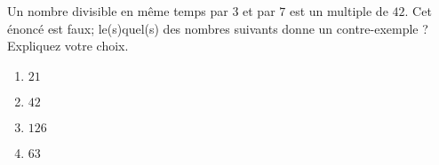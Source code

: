 
\begin{exercice}[\ldots /3]\label{exosmath-0831}

Un nombre divisible en même temps par \( 3\) et par \( 7\) est un multiple de \( 42\). Cet énoncé est faux; le(s)quel(s) des nombres suivants donne un contre-exemple ? Expliquez votre choix.
\begin{multicols}{2}
    \begin{enumerate}
        \item
            \( 21\)
        \item
            \( 42\)
        \item
            \( 126\)
        \item
            \( 63\)
    \end{enumerate}
\end{multicols}

\end{exercice}
